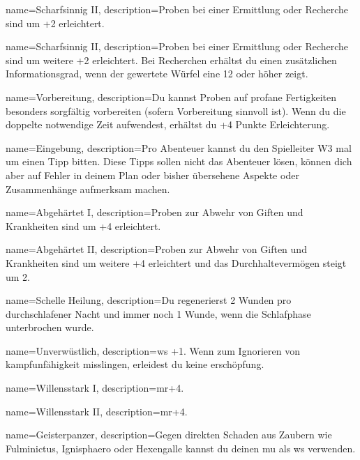 {
    name={Scharfsinnig II},
    description={Proben bei einer Ermittlung oder Recherche sind um +2 erleichtert.}}

{
    name={Scharfsinnig II},
    description={Proben bei einer Ermittlung oder Recherche sind um weitere +2 erleichtert. Bei Recherchen erhältst du einen zusätzlichen Informationsgrad, wenn der gewertete Würfel eine 12 oder höher zeigt.}}

{
    name={Vorbereitung},
    description={Du kannst Proben auf profane Fertigkeiten besonders sorgfältig vorbereiten (sofern Vorbereitung sinnvoll ist). Wenn du die doppelte notwendige Zeit aufwendest, erhältst du +4 Punkte Erleichterung.}}

{
    name={Eingebung},
    description={Pro Abenteuer kannst du den Spielleiter W3 mal um einen Tipp bitten. Diese Tipps sollen nicht das Abenteuer lösen, können dich aber auf Fehler in deinem Plan oder bisher übersehene Aspekte oder Zusammenhänge aufmerksam machen.}}

{
    name={Abgehärtet I},
    description={Proben zur Abwehr von Giften und Krankheiten sind um +4 erleichtert.}}

{
    name={Abgehärtet II},
    description={Proben zur Abwehr von Giften und Krankheiten sind um weitere +4 erleichtert und das Durchhaltevermögen steigt um 2.}}

{
    name={Schelle Heilung},
    description={Du regenerierst 2 Wunden pro durchschlafener Nacht und immer noch 1 Wunde, wenn die Schlafphase unterbrochen wurde.}}
        
{
    name={Unverwüstlich},
    description={\gls{ws} +1. Wenn  zum Ignorieren von \gls{kampfunfähigkeit} misslingen, erleidest du keine \gls{erschöpfung}.}}

{
    name={Willensstark I},
    description={\gls{mr}+4.}}

{
    name={Willensstark II},
    description={\gls{mr}+4.}}

{
    name={Geisterpanzer},
    description={Gegen direkten Schaden aus Zaubern wie Fulminictus, Ignisphaero oder Hexengalle kannst du deinen \gls{mu} als \gls{ws} verwenden.}}

